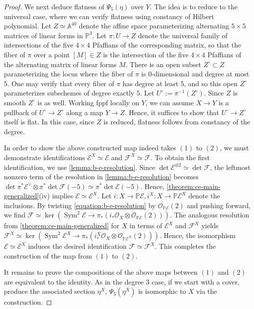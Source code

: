 \documentclass[12 pt]{amsart}
\theoremstyle{plain}
\theoremstyle{definition}
\theoremstyle{remark}
\numberwithin{equation}{section}
\newcommand\bp{\mathbb P}
\newcommand\sce{\mathscr E}
\newcommand\scf{\mathscr F}
\newcommand\sco{\mathscr O}
\DeclareMathOperator\sym{Sym}
\begin{document}
\begin{proof}
	We next deduce flatness of $\Psi_5(\eta)$ over $Y$.
	The idea is to reduce to the universal case, where we can verify
	flatness using constancy of Hilbert polynomial.
	Let $Z \simeq \mathbb A^{40}$ denote the affine space parameterizing
	alternating $5 \times 5$ matrices of linear forms in $\bp^3$. 
	Let $\pi: U \to Z$ denote the universal family of intersections of the
	five $4 \times 4$ Pfaffians of the corresponding matrix, so that the fiber of $\pi$ over a
	point $[M] \in Z$ is the intersection of the five $4 \times 4$ Pfaffians
	of the alternating matrix of linear forms $M$.
	There is an open subset $Z^\circ \subset Z$ parameterizing the locus
	where the fiber of $\pi$ is $0$-dimensional and degree at most $5$.
	One may verify that every fiber of $\pi$ has degree at least $5$, and so
	this open $Z^\circ$ parameterizes subschemes of degree exactly $5$.
	Let $U^\circ := \pi^{-1}(Z^\circ)$.
	Since $Z$ is smooth $Z^\circ$ is as well.
	Working fppf locally on $Y$, we can assume $X \to Y$ is a pullback of
	$U^\circ \to Z^\circ$ along a map $Y \to Z$.
	Hence, it suffices to show that $U^\circ \to Z^\circ$ itself is flat.
	In this case, since $Z$ is reduced,
	flatness follows from constancy of the degree.

	In order to show the above constructed map indeed takes $(1)$ to $(2)$,
	we must demonstrate
	identifications
	$\sce^X \simeq \sce$ and $\scf^X \simeq \scf$.
	To obtain the first identification, we use
	\autoref{lemma:b-e-resolution}.
	Since $\det \sce^{\otimes 2} \simeq \det \scf$, the leftmost nonzero
	term of the resolution in \autoref{lemma:b-e-resolution}
	becomes 
	$\det \pi^* \sce^\vee \otimes \pi^*\det \scf(-5) \simeq \pi^* \det \sce(-5)$.
	Hence, \autoref{theorem:ce-main-generalized}(iv) implies $\sce \simeq
	\sce^X$.
	Let $i : X \to \bp \sce, i^X : X \to \bp \sce^X$ denote the inclusions.
	By twisting \eqref{equation:b-e-resolution} by $\sco_{\bp \sce}(2)$ and
	pushing forward, we find $\scf \simeq \ker(\sym^2 \sce \to \pi_* (i_*
	\sco_X \otimes\sco_{\bp \sce}(2)))$.
	The analogous resolution from \autoref{theorem:ce-main-generalized}
	for $X$ in terms of $\sce^X$ and $\scf^X$ yields
	$\scf^X \simeq \ker(\sym^2 \sce^X \to \pi_*(i^X_* \sco_X \otimes
	\sco_{\bp \sce^X}(2)))$.
	Hence, the isomorphism $\sce \simeq \sce^X$ induces the desired
	identification $\scf
	\simeq \scf^X$.
	This completes the construction of the map from $(1)$ to $(2)$.

	It remains to prove the compositions of the above maps between $(1)$ and
	$(2)$ are equivalent to
	the identity.  As in the degree
	$3$ case, if we start with a cover, produce the associated section
	$\eta^X$, $\Psi_5(\eta^X)$ is isomorphic to $X$ via the construction.


\end{proof}
\end{document}

